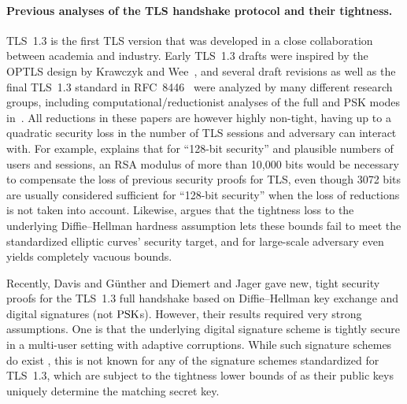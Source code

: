 \paragraph{Previous analyses of the TLS handshake protocol and their tightness.}
%
%
TLS~1.3 is the first TLS version that was developed in a close collaboration between academia and industry.
Early TLS~1.3 drafts were inspired by the OPTLS design by Krawczyk and Wee~\cite{EuroSP:KraWee16}, and several draft revisions as well as the final TLS~1.3 standard in RFC~8446~\cite{rfc8446} were analyzed by many different research groups, including computational/reductionist analyses of the full and PSK modes in~\cite{CCS:DFGS15,EPRINT:DFGS16,EuroSP:FisGue17,JC:DFGS21}.
All reductions in these papers are however highly non-tight, having up to a quadratic security loss in the number of TLS sessions and adversary can interact with.
For example, \cite{JC:DieJag21} explains that for ``128-bit security'' and plausible numbers of users and sessions, an RSA modulus of more than 10,000 bits would be necessary to compensate the loss of previous security proofs for TLS, even though 3072 bits are usually considered sufficient for ``128-bit security'' when the loss of reductions is not taken into account.
Likewise, \cite{ACNS:DavGun21} argues that the tightness loss to the underlying Diffie--Hellman hardness assumption lets these bounds fail to meet the standardized elliptic curves' security target, and for large-scale adversary even yields completely vacuous bounds.

Recently, Davis and Günther \cite{ACNS:DavGun21} and Diemert and Jager \cite{JC:DieJag21} gave new, tight security proofs for the TLS~1.3 full handshake based on Diffie--Hellman key exchange and digital signatures (not $\mathrm{PSK}$s).
However, their results required very strong assumptions. 
One is that the underlying digital signature scheme is tightly secure in a multi-user setting with adaptive corruptions. 
While such signature schemes do exist \cite{TCC:BHJKL15,C:GjoJag18,PKC:DGJL21,C:HJKLPRS21}, this is not known for any of the signature schemes standardized for TLS~1.3, which are subject to the tightness lower bounds of \cite{EC:BJLS16} as their public keys uniquely determine the matching secret key.


